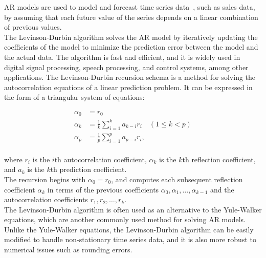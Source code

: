     AR models are used to model and forecast time series data~\cite{Durbin}, such as sales data, by assuming that each future value of the series
    depends on a linear combination of previous values.
    \\
    The Levinson-Durbin algorithm solves the AR model by iteratively updating the coefficients of the model to minimize the prediction
    error between the model and the actual data. The algorithm is fast and efficient, and it is widely used in digital signal processing,
    speech processing, and control systems, among other applications.
    The Levinson-Durbin recursion schema is a method for solving the autocorrelation equations of a linear prediction problem.
    It can be expressed in the form of a triangular system of equations:

    \begin{equation*}
        \begin{aligned}
        \alpha_0 &= r_0 \\
        \alpha_k &= \frac{1}{k} \sum_{i=1}^{k} a_{k-i} r_i \quad (1 \leq k < p) \\
        \alpha_p &= \frac{1}{p} \sum_{i=1}^{p} a_{p-i} r_i,
        \end{aligned}
    \end{equation*}
    \\
    where $r_i$ is the $i$th autocorrelation coefficient, $\alpha_k$ is the $k$th reflection coefficient, and $a_k$ is the $k$th prediction coefficient.
    \\
    The recursion begins with $\alpha_0 = r_0$, and computes each subsequent reflection coefficient $\alpha_k$ in terms of the previous
    coefficients $\alpha_0, \alpha_1, \ldots, \alpha_{k-1}$ and the autocorrelation coefficients $r_1, r_2, \ldots, r_k$.\\
    The Levinson-Durbin algorithm is often used as an alternative to the Yule-Walker equations, which are another commonly used method for
    solving AR models. Unlike the Yule-Walker equations, the Levinson-Durbin algorithm can be easily modified to handle non-stationary time
    series data, and it is also more robust to numerical issues such as rounding errors.\\

